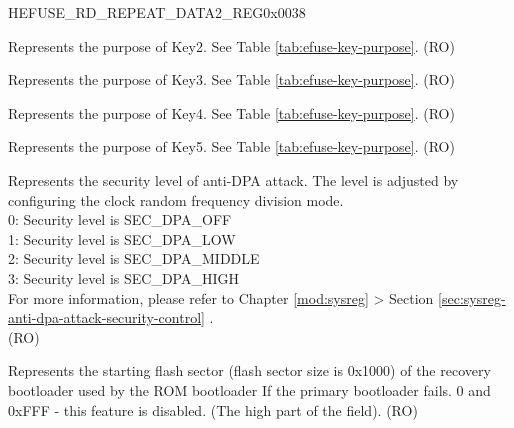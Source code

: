 \begin{register}{H}{EFUSE\_RD\_REPEAT\_DATA2\_REG}{0x0038}\label{regdesc:EFUSERDREPEATDATA2REG}
%
%
%
%
%
%
%
%
%
%
\regnewline%
\begin{regdesc}\begin{reglist}
\label{fielddesc:EFUSEKEYPURPOSE2}\item [EFUSE\_KEY\_PURPOSE\_2] Represents the purpose of Key2. See Table \ref{tab:efuse-key-purpose}. (RO)
\label{fielddesc:EFUSEKEYPURPOSE3}\item [EFUSE\_KEY\_PURPOSE\_3] Represents the purpose of Key3. See Table \ref{tab:efuse-key-purpose}. (RO)
\label{fielddesc:EFUSEKEYPURPOSE4}\item [EFUSE\_KEY\_PURPOSE\_4] Represents the purpose of Key4. See Table \ref{tab:efuse-key-purpose}. (RO)
\label{fielddesc:EFUSEKEYPURPOSE5}\item [EFUSE\_KEY\_PURPOSE\_5] Represents the purpose of Key5. See Table \ref{tab:efuse-key-purpose}. (RO)
\label{fielddesc:EFUSESECDPALEVEL}\item [EFUSE\_SEC\_DPA\_LEVEL] Represents the security level of anti-DPA attack. The level is adjusted by configuring the clock random frequency division mode.\\
0: Security level is SEC\_DPA\_OFF\\
1: Security level is SEC\_DPA\_LOW\\
2: Security level is SEC\_DPA\_MIDDLE\\
3: Security level is SEC\_DPA\_HIGH\\
For more information, please refer to Chapter \ref{mod:sysreg} \textit{} > Section \ref{sec:sysreg-anti-dpa-attack-security-control} \textit{}.\\
(RO)
\label{fielddesc:EFUSERECOVERYBOOTLOADERFLASHSECTORHI}\item [EFUSE\_RECOVERY\_BOOTLOADER\_FLASH\_SECTOR\_HI] Represents the starting flash sector (flash sector size is 0x1000) of the recovery bootloader used by the ROM bootloader If the primary bootloader fails. 0 and 0xFFF - this feature is disabled. (The high part of the field). (RO)

\end{reglist}
\end{regdesc}
\end{register}
